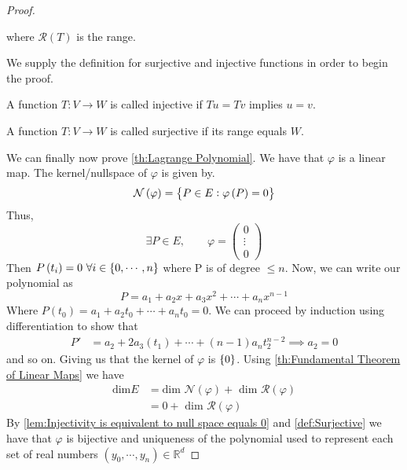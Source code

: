 \begin{proof}
\begin{ftheo}
\[        \] where $ \mathcal{ R  } \left( T\right)  $ is the range. 
        \label{th:Fundamental Theorem of Linear Maps}
    \end{ftheo}
    We supply the definition for surjective and injective functions in order to begin the
    proof. 
    \begin{defn}[Injective]
        A function $ T : V \to W $ is called injective if $ Tu = Tv  $ implies $ u = v.
        $
        \label{def:Injective}
    \end{defn}
    \begin{defn}[Surjective]
        A function $ T : V \to W $ is called surjective if its range equals $ W $.
        \label{def:Surjective}
    \end{defn}
    We can finally now prove \ref{th:Lagrange Polynomial}. We have that $ \varphi  $ is a
    linear map. The kernel/nullspace of $ \varphi  $ is given by. 
    \[
        \mathcal{ N  } \left( \varphi \right) = \set{ P \in E : \varphi\left( P\right) = 0 } 
    \]
    Thus, 
    \[
    \exists  P \in E, \qquad \varphi = \begin{pmatrix*}
         0 \\
         \vdots \\
         0
    \end{pmatrix*}
    \]
    Then $ P\left( t_i\right) = 0 \ \forall i \in \set{ 0,\cdots, n}  $ where P is of
    degree $ \leq n $. Now, we can write our polynomial as 
    \[
       P =  a_1 + a_2x + a_3x^2 + \cdots + a_nx^{n-1}
    \]
    Where $ P\left( t_0\right) = a_1 + a_2t_0 + \cdots + a_nt_0 = 0 $. We can proceed by
    induction using differentiation to show that 
    \begin{align*}
        P' &= a_2 + 2a_3(t_1) + \cdots + \left( n-1\right) a_nt_2^{ n-2 } \implies a_2 = 0  
    \end{align*}
    and so on. Giving us that the kernel of $ \varphi $ is $ \set{ 0 }  $. Using
    \ref{th:Fundamental Theorem of Linear Maps} we have 
    \begin{align*}
        \text{dim} E &= \text{dim } \mathcal{ N } \left( \varphi \right) + \text{ dim }
        \mathcal{ R  } \left( \varphi\right) \\ 
                     &= 0 + \text{ dim } \mathcal{ R  } \left( \varphi\right)   
    \end{align*} 
    By \ref{lem:Injectivity is equivalent to null space equals 0} and \ref{def:Surjective}
    we have that $ \varphi  $ is bijective and uniqueness of the polynomial used to
    represent each set of real numbers $ \left( y_0, \cdots, y_n \right) \in \mathbb{R}^d $
\end{proof}

